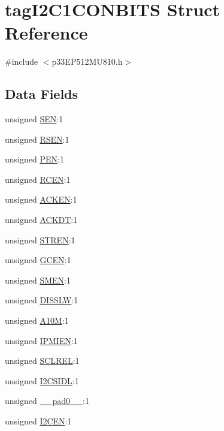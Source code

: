 \hypertarget{structtag_i2_c1_c_o_n_b_i_t_s}{}\section{tag\+I2\+C1\+C\+O\+N\+B\+I\+TS Struct Reference}
\label{structtag_i2_c1_c_o_n_b_i_t_s}


{\ttfamily \#include $<$p33\+E\+P512\+M\+U810.\+h$>$}

\subsection*{Data Fields}
\begin{DoxyCompactItemize}
\item 
unsigned \hyperlink{structtag_i2_c1_c_o_n_b_i_t_s_a425d7dbb9fc0cc96308f1deb27f8a196}{S\+EN}\+:1
\item 
unsigned \hyperlink{structtag_i2_c1_c_o_n_b_i_t_s_a209f2e7f4c953160482a183deb500100}{R\+S\+EN}\+:1
\item 
unsigned \hyperlink{structtag_i2_c1_c_o_n_b_i_t_s_a9f5c14f4c38e3f6682a0620dc8bcf5cf}{P\+EN}\+:1
\item 
unsigned \hyperlink{structtag_i2_c1_c_o_n_b_i_t_s_a4021cec43d52c6ef14d43d5d4fb6500e}{R\+C\+EN}\+:1
\item 
unsigned \hyperlink{structtag_i2_c1_c_o_n_b_i_t_s_ac5329500a2097d0eeabcd2167e44cd97}{A\+C\+K\+EN}\+:1
\item 
unsigned \hyperlink{structtag_i2_c1_c_o_n_b_i_t_s_a06a72e77e6b23ea89089b6d87675b2ea}{A\+C\+K\+DT}\+:1
\item 
unsigned \hyperlink{structtag_i2_c1_c_o_n_b_i_t_s_a815f4f81099ee6f7f25c4712495b47f9}{S\+T\+R\+EN}\+:1
\item 
unsigned \hyperlink{structtag_i2_c1_c_o_n_b_i_t_s_ad78199700673d1b061fded298551acf7}{G\+C\+EN}\+:1
\item 
unsigned \hyperlink{structtag_i2_c1_c_o_n_b_i_t_s_a33a132b33aa2680e4316437c8fc45c4a}{S\+M\+EN}\+:1
\item 
unsigned \hyperlink{structtag_i2_c1_c_o_n_b_i_t_s_a134d731ffaca1ffa232acf13b89b56f7}{D\+I\+S\+S\+LW}\+:1
\item 
unsigned \hyperlink{structtag_i2_c1_c_o_n_b_i_t_s_a745eaf048d145432b354dd30faac6066}{A10M}\+:1
\item 
unsigned \hyperlink{structtag_i2_c1_c_o_n_b_i_t_s_a1e1c02a6b9d91b9a215e275da0a183f8}{I\+P\+M\+I\+EN}\+:1
\item 
unsigned \hyperlink{structtag_i2_c1_c_o_n_b_i_t_s_a1beacca4856958a1845ff80eaee355ef}{S\+C\+L\+R\+EL}\+:1
\item 
unsigned \hyperlink{structtag_i2_c1_c_o_n_b_i_t_s_a50bdcde9531e024ad16dbac8d5dce5aa}{I2\+C\+S\+I\+DL}\+:1
\item 
unsigned \hyperlink{structtag_i2_c1_c_o_n_b_i_t_s_adf71f3d8410c1f1dbbc96680a92c49af}{\+\_\+\+\_\+pad0\+\_\+\+\_\+}\+:1
\item 
unsigned \hyperlink{structtag_i2_c1_c_o_n_b_i_t_s_ac49e41fa50e35b0c9fed9a7d0b52f5a8}{I2\+C\+EN}\+:1
\end{DoxyCompactItemize}



